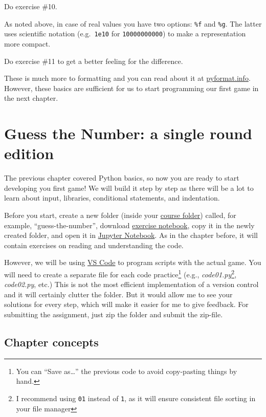 \documentclass[
]{book}
\begin{document}
Do exercise \#10.

As noted above, in case of real values you have two options: \texttt{\%f} and \texttt{\%g}. The latter uses scientific notation (e.g.~\texttt{1e10} for \texttt{10000000000}) to make a representation more compact.

Do exercise \#11 to get a better feeling for the difference.

These is much more to formatting and you can read about it at \href{https://pyformat.info/}{pyformat.info}. However, these basics are sufficient for us to start programming our first game in the next chapter.

\hypertarget{guess-the-number-single-round}{%
\chapter{Guess the Number: a single round edition}\label{guess-the-number-single-round}}

The previous chapter covered Python basics, so now you are ready to start developing you first game! We will build it step by step as there will be a lot to learn about input, libraries, conditional statements, and indentation.

Before you start, create a new folder (inside your \protect\hyperlink{files-folder}{course folder}) called, for example, ``guess-the-number'', download \href{notebooks/Seminar\%2002.\%20Guess\%20the\%20number\%20-\%20single\%20round.ipynb}{exercise notebook}, copy it in the newly created folder, and open it in \protect\hyperlink{jupyter-notebooks}{Jupyter Notebook}. As in the chapter before, it will contain exercises on reading and understanding the code.

However, we will be using \protect\hyperlink{install-vs-code}{VS Code} to program scripts with the actual game. You will need to create a separate file for each code practice\footnote{You can ``Save as\ldots{}'' the previous code to avoid copy-pasting things by hand.} (e.g., \emph{code01.py}\footnote{I recommend using \texttt{01} instead of \texttt{1}, as it will ensure consistent file sorting in your file manager}, \emph{code02.py}, etc.) This is not the most efficient implementation of a version control and it will certainly clutter the folder. But it would allow me to see your solutions for every step, which will make it easier for me to give feedback. For submitting the assignment, just zip the folder and submit the zip-file.

\hypertarget{chapter-concepts-1}{%
\section{Chapter concepts}\label{chapter-concepts-1}}
\end{document}
